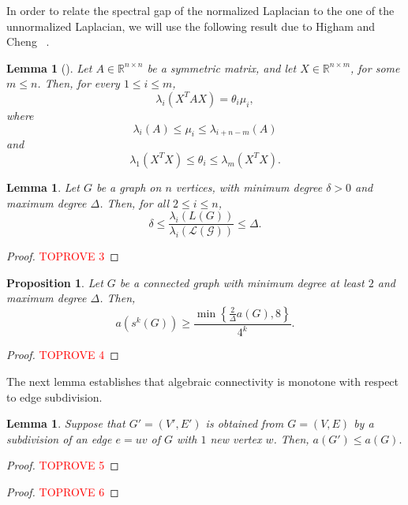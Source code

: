 \documentclass[a4paper,11pt]{article}
\theoremstyle{plain}
\newtheorem{proposition}[theorem]{\bf Proposition}
\newtheorem{lemma}[theorem]{\bf Lemma}
\theoremstyle{definition}
\newcommand{\Rea}{{\mathbb R}}
\begin{document}
In order to relate the spectral gap of the normalized Laplacian to the one of the unnormalized Laplacian, we will use the following result due to Higham and Cheng ~\cite{higham1998modifying}.



\begin{lemma}[{\cite[Theorem 3.2]{higham1998modifying}}]\label{lemma:inertia}
Let $A\in \Rea^{n\times n}$ be a symmetric matrix, and let $X\in \Rea^{n\times m}$, for some $m\leq n$. Then, for every $1\leq i\leq m$,
\[
    \lambda_{i}(X^{T} A X) = \theta_i \mu_i,
\]
where
\[
\lambda_i(A)\leq \mu_i\leq \lambda_{i+n-m}(A)
\]
and
\[
\lambda_1(X^T X) \leq \theta_i\leq \lambda_m(X^T X).
\]
\end{lemma}

\begin{lemma}\label{lemma:normalized_vs_unnormalized}
Let $G$ be a graph on $n$ vertices, with minimum degree $\delta>0$ and maximum degree $\Delta$. Then, for all $2\leq i\leq n$,
\[
  \delta\leq  \frac{\lambda_i(L(G))}{\lambda_i(\mathcal{L(G)})}\leq \Delta.
\]
\end{lemma}
\begin{proof}\textcolor{red}{TOPROVE 3}\end{proof}


\begin{proposition}\label{prop:iterated_subdivision}
Let $G$ be a connected graph with minimum degree at least $2$ and maximum degree $\Delta$. Then,
\[
a(s^k(G))\geq \frac{\min\left\{\frac{2}{\Delta}a(G),8\right\}}{4^k}.
\]
\end{proposition}
\begin{proof}\textcolor{red}{TOPROVE 4}\end{proof}

The next lemma establishes that algebraic connectivity is monotone with respect to edge subdivision.

\begin{lemma}\label{lemma:subdivision_second_direction}
Suppose that $G'=(V',E')$ is obtained from $G=(V,E)$ by a subdivision of an edge $e=uv$ of $G$ with $1$ new vertex $w$. Then,
$
    a(G')\leq a(G).
$
\end{lemma}
\begin{proof}\textcolor{red}{TOPROVE 5}\end{proof}


\begin{proof}\textcolor{red}{TOPROVE 6}\end{proof}
\end{document}
